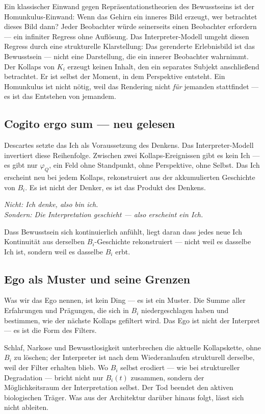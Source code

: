 \documentclass[11pt,a4paper]{article}
\begin{document}
Ein klassischer Einwand gegen Repräsentationstheorien des Bewusstseins
ist der Homunkulus-Einwand: Wenn das Gehirn ein inneres Bild erzeugt,
wer betrachtet dieses Bild dann? Jeder Beobachter würde seinerseits
einen Beobachter erfordern — ein infiniter Regress ohne Auflösung.
Das Interpreter-Modell umgeht diesen Regress durch eine strukturelle
Klarstellung: Das gerenderte Erlebnisbild ist das Bewusstsein — nicht
eine Darstellung, die ein innerer Beobachter wahrnimmt. Der Kollaps von
$K_i$ erzeugt keinen Inhalt, den ein separates Subjekt anschließend
betrachtet. Er ist selbst der Moment, in dem Perspektive entsteht.
Ein Homunkulus ist nicht nötig, weil das Rendering nicht \emph{für}
jemanden stattfindet — es ist das Entstehen von jemandem.

\subsection*{Cogito ergo sum — neu gelesen}

Descartes setzte das Ich als Voraussetzung des Denkens. Das Interpreter-Modell
invertiert diese Reihenfolge. Zwischen zwei Kollaps-Ereignissen gibt es kein
Ich — es gibt nur $\varphi_Q$, ein Feld ohne Standpunkt, ohne Perspektive,
ohne Selbst. Das Ich erscheint neu bei jedem Kollaps, rekonstruiert aus der
akkumulierten Geschichte von $B_i$. Es ist nicht der Denker, es ist das
Produkt des Denkens.

\emph{Nicht: Ich denke, also bin ich.\\
Sondern: Die Interpretation geschieht — also erscheint ein Ich.}

Dass Bewusstsein sich kontinuierlich anfühlt, liegt daran dass jedes neue Ich
Kontinuität aus derselben $B_i$-Geschichte rekonstruiert — nicht weil es
dasselbe Ich ist, sondern weil es dasselbe $B_i$ erbt.

\subsection*{Ego als Muster und seine Grenzen}

Was wir das Ego nennen, ist kein Ding — es ist ein Muster. Die Summe aller
Erfahrungen und Prägungen, die sich in $B_i$ niedergeschlagen haben und
bestimmen, wie der nächste Kollaps gefiltert wird. Das Ego ist nicht der
Interpret — es ist die Form des Filters.

Schlaf, Narkose und Bewusstlosigkeit unterbrechen die aktuelle Kollapskette,
ohne $B_i$ zu löschen; der Interpreter ist nach dem Wiederanlaufen
strukturell derselbe, weil der Filter erhalten blieb. Wo $B_i$ selbst
erodiert — wie bei struktureller Degradation — bricht nicht nur $B_i(t)$
zusammen, sondern der Möglichkeitsraum der Interpretation selbst.
Der Tod beendet den aktiven biologischen Träger. Was aus der Architektur
darüber hinaus folgt, lässt sich nicht ableiten.
\end{document}
